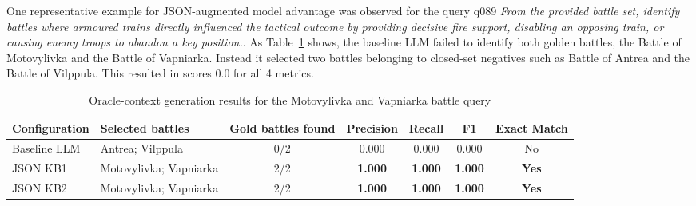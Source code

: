 One representative example for JSON-augmented model advantage was observed for the query q089 \textit{From the provided battle set, identify battles where armoured trains directly influenced the tactical outcome by providing decisive fire support, disabling an opposing train, or causing enemy troops to abandon a key position.}. As Table~\ref{tab:oracle_battle_example} shows, the baseline LLM failed to identify both golden battles, the Battle of Motovylivka and the Battle of Vapniarka. Instead it selected two battles belonging to closed-set negatives such as Battle of Antrea and the Battle of Vilppula. This resulted in scores 0.0 for all 4 metrics. 
\begin{table}[H]
    \centering
    \caption{Oracle-context generation results for the Motovylivka and Vapniarka battle query}
    \label{tab:oracle_battle_example}

    \small
    \renewcommand{\arraystretch}{1.5}
    \setlength{\tabcolsep}{4pt}

    \begin{tabular}{
        >{\raggedright\arraybackslash}p{}
        >{\raggedright\arraybackslash}p{}
        c c c c c
    }
        \toprule
        \textbf{Configuration} &
        \textbf{Selected battles} &
        \textbf{Gold battles found} &
        \textbf{Precision} &
        \textbf{Recall} &
        \textbf{F1} &
        \textbf{Exact Match} \\
        \midrule

        Baseline LLM &
        Antrea; Vilppula &
        0/2 &
        0.000 &
        0.000 &
        0.000 &
        No \\
        \midrule

        JSON KB1 &
        Motovylivka; Vapniarka &
        2/2 &
        \textbf{1.000} &
        \textbf{1.000} &
        \textbf{1.000} &
        \textbf{Yes} \\
        \midrule

        JSON KB2 &
        Motovylivka; Vapniarka &
        2/2 &
        \textbf{1.000} &
        \textbf{1.000} &
        \textbf{1.000} &
        \textbf{Yes} \\

        \bottomrule
    \end{tabular}
\end{table}
